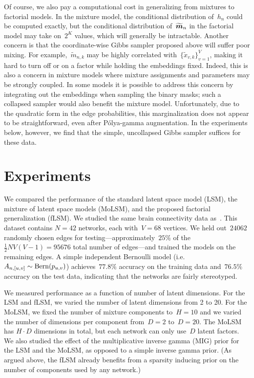 Of course, we also pay a computational cost in generalizing from
mixtures to factorial models.  In the mixture model, the conditional
distribution of~$h_n$ could be computed exactly, but the conditional
distribution of~$\widetilde{\boldsymbol{m}}_n$ in the factorial model may take
on~$2^K$ values, which will generally be intractable.  Another concern is
that the coordinate-wise Gibbs sampler proposed above will suffer poor
mixing. For example,~$\widetilde{m}_{n,k}$ may be highly correlated
with~$\{\widetilde{x}_{v,k}\}_{v=1}^V$, making it hard to turn off or
on a factor while holding the embeddings fixed. Indeed, this is also a
concern in mixture models where mixture assignments and parameters may
be strongly coupled. In some models it is possible to address this
concern by integrating out the embeddings when sampling the binary
masks; such a collapsed sampler would also benefit the mixture model.
Unfortunately, due to the quadratic form in the edge probabilities,
this marginalization does not appear to be straightforward, even after
P\'{o}lya-gamma augmentation.  In the experiments below, however, we find that
the simple, uncollapsed Gibbs sampler suffices for these data. 

\section{Experiments}

We compared the performance of the standard latent space model (LSM),
the mixture of latent space models (MoLSM), and the proposed factorial
generalization (fLSM). We studied the same brain connectivity
data as~\citet{durante2016nonparametric}. This dataset
contains ${N=42}$ networks, each with~${V=68}$ vertices.  We held
out~$24062$ randomly chosen edges for testing---approximately~$25\%$ of the
${\tfrac{1}{2}NV(V-1) = 95676}$ total number of edges---and trained
the models on the remaining edges. A simple independent Bernoulli model
(i.e.~${A_{n,[u,v]} \sim \mathrm{Bern}(p_{u,v})}$) achieves~$77.8\%$
accuracy on the training data and~$76.5\%$ accuracy on the test data,
indicating that the networks are fairly stereotyped.

We measured performance as a function of number of latent dimensions.
For the LSM and fLSM, we varied the number of latent dimensions from 2 to 20.
For the MoLSM, we fixed the
number of mixture components to~${H=10}$ and we varied the number of
dimensions per component from~$D=2$ to~$D=20$.  The MoLSM has
$H \cdot D$ dimensions in total, but
each network can only use~$D$ latent factors. We also 
studied the effect of the multiplicative inverse gamma (MIG) prior for the
LSM and the MoLSM, as opposed to a simple inverse gamma prior.
(As argued above, the fLSM already benefits from a
sparsity inducing prior on the number of components used by any
network.)

